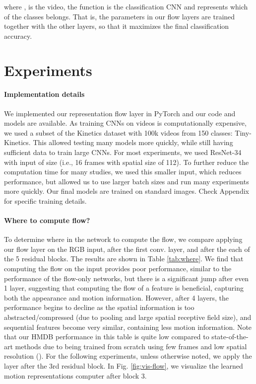 \documentclass[10pt,twocolumn,letterpaper]{article}
\begin{document}
where ,  is the video, the function  is the classification CNN and  represents which of the  classes  belongs. That is, the parameters in our flow layers are trained together with the other layers, so that it maximizes the final classification accuracy.

\section{Experiments}

\vspace{-3pt}
\paragraph{Implementation details} We implemented our representation flow layer in PyTorch and our code and models are available. As training CNNs on videos is computationally expensive, we used a subset of the Kinetics dataset \cite{kay2017kinetics} with 100k videos from 150 classes: Tiny-Kinetics. This allowed testing many models more quickly, while still having sufficient data to train large CNNs. For most experiments, we used ResNet-34 \cite{he2016deep} with input of size  (i.e., 16 frames with spatial size of 112). To further reduce the computation time for many studies, we used this smaller input, which reduces performance, but allowed us to use larger batch sizes and run many experiments more quickly. Our final models are trained on standard  images. Check Appendix for specific training details.



\vspace{-3pt}
\paragraph{Where to compute flow?} To determine where in the network to compute the flow, we compare applying our flow layer on the RGB input, after the first conv. layer, and after the each of the 5 residual blocks. The results are shown in Table \ref{tab:where}. We find that computing the flow on the input provides poor performance, similar to the performance of the flow-only networks, but there is a significant jump after even 1 layer, suggesting that computing the flow of a feature is beneficial, capturing both the appearance and motion information. However, after 4 layers, the performance begins to decline as the spatial information is too abstracted/compressed (due to pooling and large spatial receptive field size), and sequential features become very similar, containing less motion information. Note that our HMDB performance in this table is quite low compared to state-of-the-art methods due to being trained from scratch using few frames and low spatial resolution (). For the following experiments, unless otherwise noted, we apply the layer after the 3rd residual block. In Fig. \ref{fig:vis-flow}, we visualize the learned motion representations computer after block 3.
\end{document}
